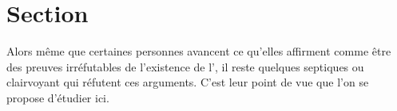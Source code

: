 \section{Section}
Alors même que certaines personnes avancent ce qu'elles affirment comme être des preuves irréfutables de l'existence de l'\op, il reste quelques septiques ou clairvoyant qui réfutent ces arguments.
C'est leur point de vue que l'on se propose d'étudier ici.